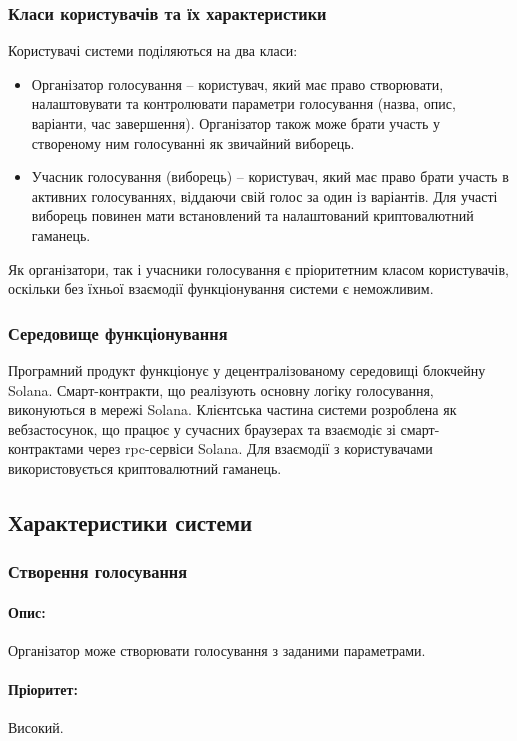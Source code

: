 \documentclass[14pt]{extreport}
\begin{document}
  \subsubsection{Класи користувачів та їх характеристики}
  Користувачі системи поділяються на два класи:
  \begin{itemize}
    \item Організатор голосування – користувач, який має право створювати, налаштовувати та контролювати параметри голосування (назва, опис, варіанти, час завершення). Організатор також може брати участь у створеному ним голосуванні як звичайний виборець.
    \item Учасник голосування (виборець) – користувач, який має право брати участь в активних голосуваннях, віддаючи свій голос за один із варіантів. Для участі виборець повинен мати встановлений та налаштований криптовалютний гаманець. 
  \end{itemize}
  
  Як організатори, так і учасники голосування є пріоритетним класом користувачів, оскільки без їхньої взаємодії функціонування системи є неможливим.
  
  \subsubsection{Середовище функціонування}
  Програмний продукт функціонує у децентралізованому середовищі блокчейну Solana. Смарт-контракти, що реалізують основну логіку голосування, виконуються в мережі Solana. Клієнтська частина системи розроблена як вебзастосунок, що працює у сучасних браузерах та взаємодіє зі смарт-контрактами через \gls{rpc}-сервіси Solana. Для взаємодії з користувачами використовується криптовалютний гаманець.

  \subsection{Характеристики системи}
  \subsubsection{Створення голосування}  
  \paragraph{Опис:} Організатор може створювати голосування з заданими параметрами.  
  \paragraph{Пріоритет:} Високий.
\end{document}
